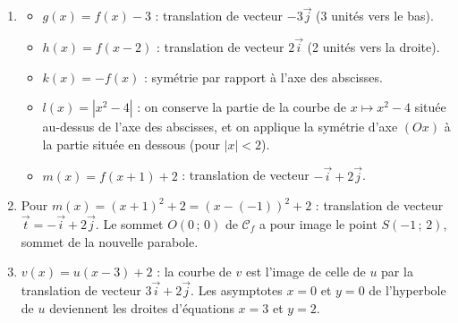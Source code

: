 \documentclass[11pt]{article}
\begin{document}
\begin{corrige}
\begin{enumerate}
\item \begin{itemize}
\item $g(x)=f(x)-3$ : translation de vecteur $-3\vec{j}$ (3 unités vers le bas).
\item $h(x)=f(x-2)$ : translation de vecteur $2\vec{i}$ (2 unités vers la droite).
\item $k(x)=-f(x)$ : symétrie par rapport à l'axe des abscisses.
\item $l(x)=|x^{2}-4|$ : on conserve la partie de la courbe de $x\mapsto x^{2}-4$ située au-dessus de l'axe des abscisses, et on applique la symétrie d'axe $(Ox)$ à la partie située en dessous (pour $|x|<2$).
\item $m(x)=f(x+1)+2$ : translation de vecteur $-\vec{i}+2\vec{j}$.
\end{itemize}
\item Pour $m(x)=(x+1)^{2}+2=(x-(-1))^{2}+2$ : translation de vecteur $\vec{t}=-\vec{i}+2\vec{j}$. Le sommet $O(0\,;\,0)$ de $\mathcal{C}_{f}$ a pour image le point $S(-1\,;\,2)$, sommet de la nouvelle parabole.
\item $v(x)=u(x-3)+2$ : la courbe de $v$ est l'image de celle de $u$ par la translation de vecteur $3\vec{i}+2\vec{j}$. Les asymptotes $x=0$ et $y=0$ de l'hyperbole de $u$ deviennent les droites d'équations $x=3$ et $y=2$.
\end{enumerate}
\end{corrige}
\end{document}
